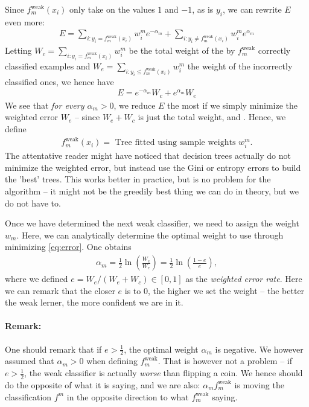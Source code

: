 \documentclass{article}
\newcommand{\weak}{\mathrm{weak}}
\begin{document}
Since $f^\weak_m(x_i)$ only take on the values $1$ and $-1$, as is $y_i$, we can rewrite $E$ even more:
\begin{align*}
    E= \sum_{i : y_i = f_m^\weak(x_i)}w_i^m e^{-\alpha_m} + \sum_{i : y_i \neq f_m^\weak(x_i)}w_i^m e^{\alpha_m} 
\end{align*}
Letting $W_c= \sum_{i : y_i = f_m^\weak(x_i)}w_i^m$ be the total weight of the by $f_m^\weak$ correctly classified examples and $W_e =  \sum_{i : y_i \leq f_m^\weak(x_i)}w_i^m$ the weight of the incorrectly classified ones, we hence have
\begin{align} \label{eq:error}
    E = e^{-\alpha_m} W_c + e^{\alpha_m}W_e
\end{align}
We see that \emph{for every $\alpha_m>0$}, we reduce $E$ the most if we simply minimize the weighted error $W_e$ -- since $W_e+W_c$ is just the total weight, and . Hence, we define
\begin{align} \label{eq:weak tree}
    f_m^\weak(x_i) = \text{ Tree fitted using sample weights $w_i^m$.}
\end{align}
The attentative reader might have noticed that decision trees actually do not minimize the weighted error, but instead use the Gini or entropy errors to build the 'best' trees. This works better in practice, but is no problem for the algorithm -- it might not be the greedily best thing we can do in theory, but we do not have to.

Once we have determined the next weak classifier, we need to assign the weight $w_m$. Here, we can analytically determine the optimal weight to use through minimizing \eqref{eq:error}. One obtains
\begin{align} \label{eq:optimal_alpha}
    \alpha_m = \frac{1}{2}\ln\left(\frac{W_c}{W_e}\right) = \frac{1}{2}\ln\left(\frac{1-e}{e}\right),
\end{align}
where we defined $e=W_e/(W_e+W_c)\in [0,1]$ as the \emph{weighted error rate}. Here we can remark that the closer $e$ is to $0$, the higher we set the weight -- the better the weak lerner, the more confident we are in it. 

\paragraph{Remark:} One should remark that if $e>\tfrac{1}{2}$, the optimal weight $\alpha_m$ is negative. We however assumed that $\alpha_m>0$ when defining $f_m^\weak$. That is however not a problem -- if $e>\tfrac{1}{2}$, the weak classifier is actually \emph{worse} than flipping a coin. We hence should do the opposite of what it is saying, and we are also: $\alpha_mf_m^\weak$ is moving the classification $f^m$ in the opposite direction to what $f_m^\weak$ saying.
\end{document}
